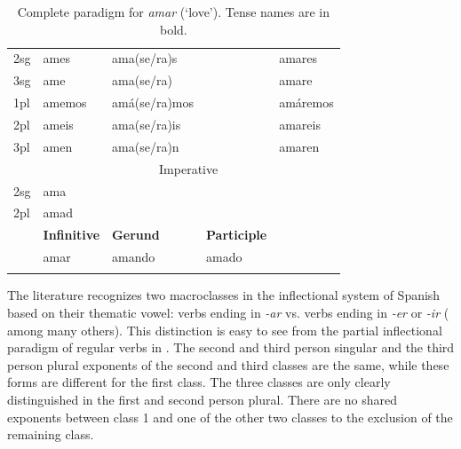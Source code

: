 \begin{table}[!htpb]
\begin{tabular}{lllll}
    2sg & ames                & ama(se/ra)s        &                    & amares          \\
    3sg & ame                 & ama(se/ra)         &                    & amare           \\
    1pl & amemos              & amá(se/ra)mos      &                    & amáremos        \\
    2pl & ameis               & ama(se/ra)is       &                    & amareis         \\
    3pl & amen                & ama(se/ra)n        &                    & amaren          \\
    \midrule
        & \multicolumn{4}{c}{Imperative}                                                  \\
    2sg & ama                                                                             \\
    2pl & amad                                                                            \\
    \midrule
        & \textbf{Infinitive} & \textbf{Gerund}    & \textbf{Participle}                  \\
        & amar                & amando             & amado                                \\
    \lspbottomrule
  \end{tabular}\caption{Complete paradigm for \textit{amar} (`love'). Tense names are in bold.}\label{tab:conj-sp}
\end{table}

The literature recognizes two macroclasses in the inflectional system of Spanish based on their thematic vowel: verbs ending in \textit{-ar} vs. verbs ending in \textit{-er} or \textit{-ir} (\citealt{Aguirre.2008} among many others). This distinction is easy to see from the partial inflectional paradigm of regular verbs in .
The second and third person singular and the third person plural exponents of the second and third classes are the same, while these forms are different for the first class. The three classes are only clearly distinguished in the first and second person plural. There are no shared exponents between class 1 and one of the other two classes to the exclusion of the remaining class.

